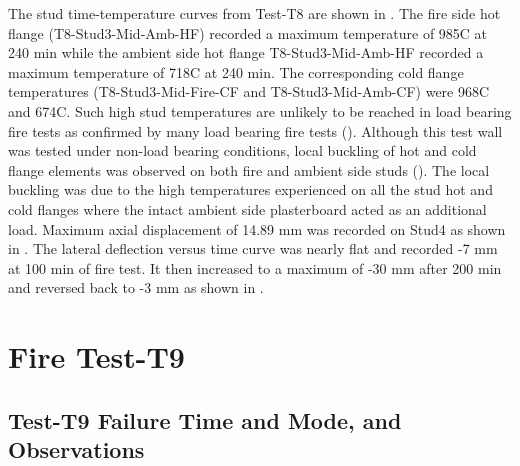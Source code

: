 The stud time-temperature curves from Test-T8 are shown in . The fire side hot flange (T8-Stud3-Mid-Amb-HF) recorded a maximum temperature of 985\degree C at 240 min while the ambient side hot flange T8-Stud3-Mid-Amb-HF recorded a maximum temperature of 718\degree C at 240 min. The corresponding cold flange temperatures (T8-Stud3-Mid-Fire-CF and T8-Stud3-Mid-Amb-CF) were 968\degree C and 674\degree C. Such high stud temperatures are unlikely to be reached in load bearing fire tests as confirmed by many load bearing fire tests (\citet{Feng2005,Chen2012a,Kodur2013}). Although this test wall was tested under non-load bearing conditions, local buckling of hot and cold flange elements was observed on both fire and ambient side studs (). The local buckling was due to the high temperatures experienced on all the stud hot and cold flanges where the intact ambient side plasterboard acted as an additional load. Maximum axial displacement of 14.89 mm was recorded on Stud4 as shown in . The lateral deflection versus time curve was nearly flat and recorded -7 mm at 100 min of fire test. It then increased to a maximum of -30 mm after 200 min and reversed back to -3 mm as shown in .

\section{Fire Test-T9}
\subsection{Test-T9 Failure Time and Mode, and Observations}

